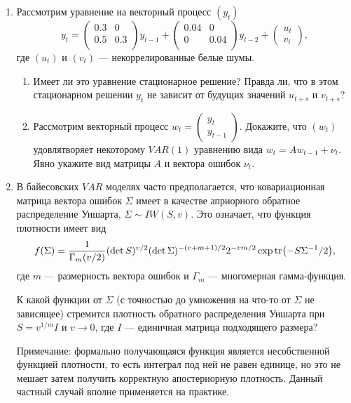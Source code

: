 \documentclass[12pt]{article}
\begin{document}
\begin{enumerate}
\item Рассмотрим уравнение на векторный процесс $(y_t)$
\[
y_t   =
\begin{pmatrix}
    0.3 & 0 \\
    0.5 & 0.3 \\
\end{pmatrix}
y_{t-1}  +
\begin{pmatrix}
    0.04 & 0 \\
    0 & 0.04 \\
\end{pmatrix}
y_{t-2} +
\begin{pmatrix}
    u_t \\
    v_t
\end{pmatrix},
\]
где $(u_t)$ и $(v_t)$ — некоррелированные белые шумы. 
\begin{enumerate}
    \item Имеет ли это уравнение стационарное решение? 
    Правда ли, что в этом стационарном решении $y_t$ не зависит от будущих значений $u_{t+s}$ и $v_{t+s}$?
    \item Рассмотрим векторный процесс
    $
        w_t = \begin{pmatrix}
            y_t \\
            y_{t-1}
        \end{pmatrix}.
    $
    Докажите, что $(w_t)$ удовлятворяет некоторому $VAR(1)$ уравнению вида 
    $
    w_t = A w_{t-1} + \nu_t.    
    $
    Явно укажите вид матрицы $A$ и вектора ошибок $\nu_t$.
\end{enumerate}
\item В байесовских $VAR$ моделях часто предполагается, 
что ковариационная матрица вектора ошибок $\Sigma$ имеет в качестве априорного обратное распределение Уишарта, $\Sigma \sim IW(S, v)$.
Это означает, что функция плотности имеет вид 
\[
f(\Sigma) = \frac{1}{\Gamma_m(v/2)}(\det S)^{v/2} (\det \Sigma)^{-(v+m+1)/2}2^{-vm/2}\exp\tr(-S\Sigma^{-1}/2),
\]
где $m$ — размерность вектора ошибок и $\Gamma_m$ — многомерная гамма-функция. 


К какой функции от $\Sigma$ (с точностью до умножения на что-то от $\Sigma$ не зависящее) стремится плотность обратного распределения Уишарта
при $S = v^{1/m} I$ и $v\to 0$, где $I$ — единичная матрица подходящего размера?

Примечание: формально получающаяся функция является несобственной функцией плотности, 
то есть интеграл под ней не равен единице, но это не мешает затем получить корректную апостериорную плотность. 
Данный частный случай вполне применяется на практике.



\end{enumerate}
\end{document}
